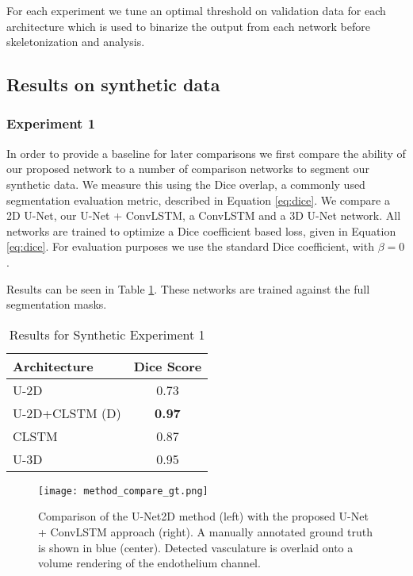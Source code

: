 \documentclass[journal,transmag]{IEEEtran}
\begin{document}
For each experiment we tune an optimal threshold on validation data for each architecture which is used to binarize the output from each network before skeletonization and analysis. 

\subsection{Results on synthetic data}

\subsubsection*{Experiment 1}
In order to provide a baseline for later comparisons we first compare the ability of our proposed network to a number of comparison networks to segment our synthetic data. We measure this using the Dice overlap, a commonly used segmentation evaluation metric, described in Equation \ref{eq:dice}. We compare a 2D U-Net, our U-Net + ConvLSTM, a ConvLSTM and a 3D U-Net network. All networks are trained to optimize a Dice coefficient based loss, given in Equation \ref{eq:dice}. For evaluation purposes we use the standard Dice coefficient, with $\beta = 0$. 

Results can be seen in Table \ref{tab:synth_seg_dice}. These networks are trained against the full segmentation masks. 

\begin{table}[h]
\centering
\begin{tabular}{l|c}
Architecture & Dice Score  \\
\hline
                U-2D & 0.73 \\
                U-2D+CLSTM (D)& \textbf{0.97} \\
                CLSTM & 0.87  \\
                U-3D &  0.95  \\
\end{tabular}
\caption{Results for Synthetic Experiment 1}
\label{tab:synth_seg_dice}
\end{table}

\begin{figure*}[t]
\texttt{[image: method\_compare\_gt.png]}
\caption{Comparison of the U-Net2D method (left) with the proposed U-Net + ConvLSTM approach (right). A manually annotated ground truth is shown in blue (center). Detected vasculature is overlaid onto a volume rendering of the endothelium channel.}
\label{fig:results_compare}
\end{figure*}
\end{document}
